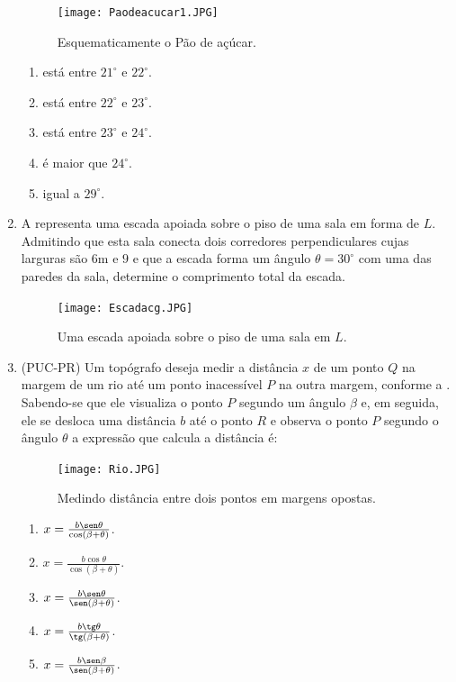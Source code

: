 \begin{enumerate}
\begin{figure}[H]
    \centering
    \texttt{[image: Paodeacucar1.JPG]}
    \caption{Esquematicamente o Pão de açúcar.}
    \label{Paodeacucar1}
\end{figure}

\begin{enumerate}
    \item está entre $21^\circ$ e $22^\circ$.
    \item está entre $22^\circ$ e $23^\circ$.
    \item está entre $23^\circ$ e $24^\circ$.
    \item é maior que $24^\circ$.
    \item igual a $29^\circ$.
\end{enumerate}

\item{} A  representa uma escada apoiada sobre o piso de uma sala em forma de $L$. Admitindo que esta sala conecta dois corredores perpendiculares cujas larguras são $6$m e $9$ e que a escada forma um ângulo $\theta=30^\circ$ com uma das paredes da sala, determine o comprimento total da escada.
\begin{figure}[H]
    \centering
    \texttt{[image: Escadacg.JPG]}
    \caption{Uma escada apoiada sobre o piso de uma sala em $L$.}
    \label{Escadacg}
\end{figure}

\item{}
(PUC-PR) Um topógrafo deseja medir a distância $x$ de um ponto $Q$ na margem de um rio até um ponto inacessível $P$  na outra margem, conforme a . Sabendo-se que ele visualiza o ponto $P$ segundo um ângulo $\beta$ e, em seguida, ele se desloca uma distância $b$  até o ponto $R$  e observa o ponto $P$ segundo o ângulo $\theta$  a expressão que calcula a distância  é:
\begin{figure}[H]
    \centering
    \texttt{[image: Rio.JPG]}
    \caption{Medindo distância entre dois pontos em margens opostas.}
    \label{Rio}
\end{figure}
\begin{enumerate}
    \item $x=\frac{b\sen\theta}{\cos(\beta+\theta)}$.
    \item $x=\frac{b\cos\theta}{\cos(\beta+\theta)}$.
    \item $x=\frac{b\sen\theta}{\sen(\beta+\theta)}$.
    \item $x=\frac{b\tg\theta}{\tg(\beta+\theta)}$.
    \item $x=\frac{b\sen\beta}{\sen(\beta+\theta)}$.
\end{enumerate}


\end{enumerate}
